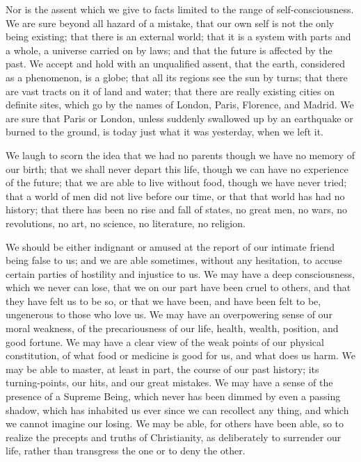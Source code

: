 Nor is the assent which we give to facts limited to the range of
self-consciousness. We are sure beyond all hazard of a mistake, that
our own self is not the only being existing; that there is an external
world; that it is a system with parts and a whole, a universe carried
on by laws; and that the future is affected by the past. We accept and
hold with an unqualified assent, that the earth, considered as a
phenomenon, is a globe; that all its regions see the sun by turns;
that there are vast tracts on it of land and water; that there are
really existing cities on definite sites, which go by the names of
London, Paris, Florence, and Madrid. We are sure that Paris or London,
unless suddenly swallowed up by an earthquake or burned to the ground,
is today just what it was yesterday, when we left it.

We laugh to scorn the idea that we had no parents though we
have no memory of our birth; that we shall never depart this life,
though we can have no experience of the future; that we are able to
live without food, though we have never tried; that a world of men did
not live before our time, or that that world has had no history; that
there has been no rise and fall of states, no great men, no wars, no
revolutions, no art, no science, no literature, no religion.

We should be either indignant or amused at the report of our
intimate friend being false to us; and we are able sometimes, without
any hesitation, to accuse certain parties of hostility and injustice
to us. We may have a deep consciousness, which we never can lose, that
we on our part have been cruel to others, and that they have felt us
to be so, or that we have been, and have been felt to be, ungenerous
to those who love us. We may have an overpowering sense of our moral
weakness, of the precariousness of our life, health, wealth, position,
and good fortune. We may have a clear view of the weak points of our
physical constitution, of what food or medicine is good for us, and
what does us harm. We may be able to master, at least in part, the
course of our past history; its turning-points, our hits, and our
great mistakes. We may have a sense of the presence of a Supreme
Being, which never has been dimmed by even a passing shadow, which has
inhabited us ever since we can recollect any thing, and which we
cannot imagine our losing. We may be able, for others have been able,
so to realize the precepts and truths of Christianity, as deliberately
to surrender our life, rather than transgress the one or to deny the
other.

